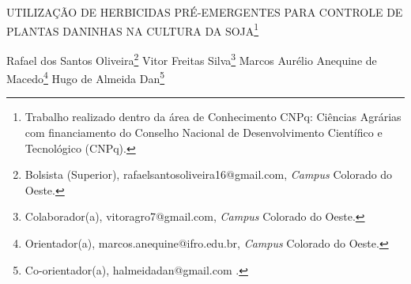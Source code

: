 \documentclass[article,12pt,onesidea,4paper,english,brazil]{abntex2}
\begin{document}
	
	
	\frenchspacing 
	
	\begin{center}
		\LARGE UTILIZAÇÃO DE HERBICIDAS PRÉ-EMERGENTES PARA CONTROLE DE
		PLANTAS DANINHAS NA CULTURA DA SOJA\footnote{Trabalho realizado dentro da área de Conhecimento CNPq: Ciências Agrárias com financiamento do Conselho Nacional de Desenvolvimento Científico e Tecnológico (CNPq).}
		
		\normalsize
		Rafael dos Santos Oliveira\footnote{Bolsista (Superior), rafaelsantosoliveira16@gmail.com, \textit{Campus} Colorado do Oeste.} 
		Vitor Freitas Silva\footnote{Colaborador(a), vitoragro7@gmail.com, \textit{Campus} Colorado do Oeste.} 
		Marcos Aurélio Anequine de Macedo\footnote{Orientador(a), marcos.anequine@ifro.edu.br, \textit{Campus} Colorado do Oeste.} 
		Hugo de Almeida Dan\footnote{Co-orientador(a), halmeidadan@gmail.com .} 
	\end{center}
	
\end{document}
